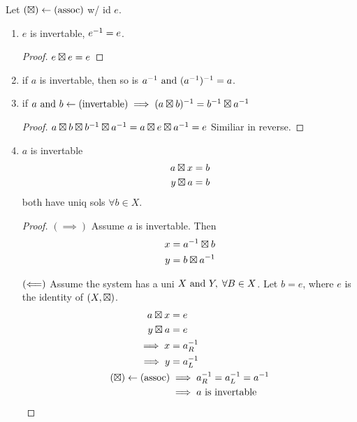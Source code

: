 \documentclass[12pt]{article}
\begin{document}
\bbox
\begin{lem}\label{lem:prop_of_inv}
  Let \((\boxtimes)\leftarrow(\mathrm{assoc})\) w/ id \(e\). 
  \begin{enumerate}
    \item \(e\) is invertable, \(e^{-1}=e\). \bboxproof\begin{proof} \(e\boxtimes e=e\)\end{proof}\ebox
    \item if \(a\) is invertable, then so is \(a^{-1}\text{ and } (a^{-1})^{-1}=a\).
    \item if \(a\text{ and } b\leftarrow(\mathrm{invertable})\implies(a\boxtimes b)^{-1}=b^{-1}\boxtimes a^{-1}\)
      \bboxproof
      \begin{proof}\(a\boxtimes b\boxtimes b^{-1}\boxtimes a^{-1}=a\boxtimes e\boxtimes a^{-1}=e\) 
        Similiar in reverse.
      \end{proof}
      \ebox
    \item \(a\) is invertable 
      \begin{equation*}
        \begin{split}
          a\boxtimes x&=b\\
          y\boxtimes a&=b
        \end{split}
      \end{equation*} both have uniq sols \(\forall b\in X\).
      \bboxproof
      \begin{proof}
        \((\implies)\) Assume \(a\) is invertable. Then
        \begin{equation*}
          \begin{split}
            x&=a^{-1}\boxtimes b\\
            y&=b\boxtimes a^{-1}
          \end{split}
        \end{equation*}

        \((\Longleftarrow)\) Assume the system has a uni \(X\text{ and } Y,\;\forall B\in X\).
        Let \(b=e\), where \(e\) is the identity of \((X,\boxtimes)\).
        \begin{equation*}
          \begin{split}
            a\boxtimes x&=e\\
            y\boxtimes a&=e\\
            \implies x&=a^{-1}_R\\
            \implies y&=a^{-1}_L\\
            (\boxtimes)\leftarrow(\mathrm{assoc})&\implies a^{-1}_R=a^{-1}_L=a^{-1}\\
                               &\implies a\text{ is invertable}
          \end{split}
        \end{equation*}
      \end{proof}
      \ebox
  \end{enumerate}
\end{lem}
\ebox


\end{document}
